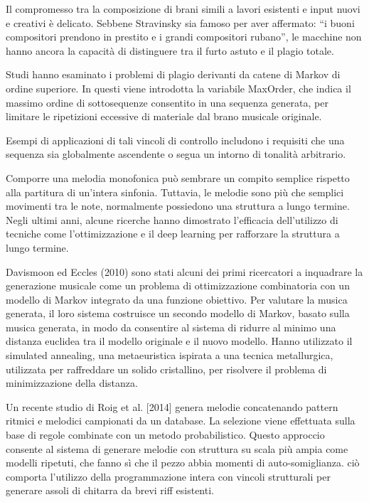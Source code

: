 \documentclass[a4paper,12pt]{report}
\begin{document}
Il compromesso tra la composizione di brani simili a lavori esistenti e input nuovi e creativi è delicato. 
Sebbene Stravinsky sia famoso per aver affermato: “i buoni compositori prendono in prestito e i grandi compositori rubano”, 
le macchine non hanno ancora la capacità di distinguere tra il furto astuto e il plagio totale.

Studi hanno esaminato i problemi di plagio derivanti da catene di Markov di ordine superiore.
In questi viene introdotta la variabile MaxOrder, che indica il massimo ordine di sottosequenze consentito in una sequenza generata, per limitare le ripetizioni eccessive di materiale dal brano musicale originale.

Esempi di applicazioni di tali vincoli di controllo includono i requisiti che una sequenza sia globalmente ascendente o segua un intorno di tonalità arbitrario.

Comporre una melodia monofonica può sembrare un compito semplice rispetto alla partitura di un'intera sinfonia. 
Tuttavia, le melodie sono più che semplici movimenti tra le note, normalmente possiedono una struttura a lungo termine. 
Negli ultimi anni, alcune ricerche hanno dimostrato l’efficacia dell’utilizzo di tecniche come l’ottimizzazione e il deep learning per rafforzare la struttura a lungo termine.

Davismoon ed Eccles (2010) sono stati alcuni dei primi ricercatori a inquadrare la generazione musicale come un problema di ottimizzazione combinatoria con un modello di Markov integrato da una funzione obiettivo. 
Per valutare la musica generata, il loro sistema costruisce un secondo modello di Markov, basato sulla musica generata, in modo da consentire al sistema di ridurre al minimo una distanza euclidea tra il modello originale e il nuovo modello. 
Hanno utilizzato il simulated annealing, una metaeuristica ispirata a una tecnica metallurgica, utilizzata per raffreddare un solido cristallino, per risolvere il problema di minimizzazione della distanza. 

Un recente studio di Roig et al. [2014] genera melodie concatenando pattern ritmici e melodici campionati da un database. 
La selezione viene effettuata sulla base di regole combinate con un metodo probabilistico. 
Questo approccio consente al sistema di generare melodie con struttura su scala più ampia come modelli ripetuti, che fanno sì che il pezzo abbia momenti di auto-somiglianza.
ciò comporta l'utilizzo della programmazione intera con vincoli strutturali per generare assoli di chitarra da brevi riff esistenti.
\end{document}
